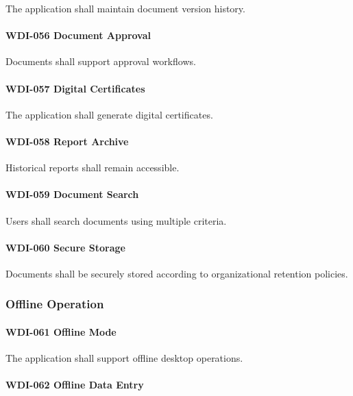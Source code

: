 The application shall maintain document version history.

\paragraph{WDI-056 Document Approval}

Documents shall support approval workflows.

\paragraph{WDI-057 Digital Certificates}

The application shall generate digital certificates.

\paragraph{WDI-058 Report Archive}

Historical reports shall remain accessible.

\paragraph{WDI-059 Document Search}

Users shall search documents using multiple criteria.

\paragraph{WDI-060 Secure Storage}

Documents shall be securely stored according to organizational
retention policies.


\subsubsection*{Offline Operation}

\paragraph{WDI-061 Offline Mode}

The application shall support offline desktop operations.

\paragraph{WDI-062 Offline Data Entry}

